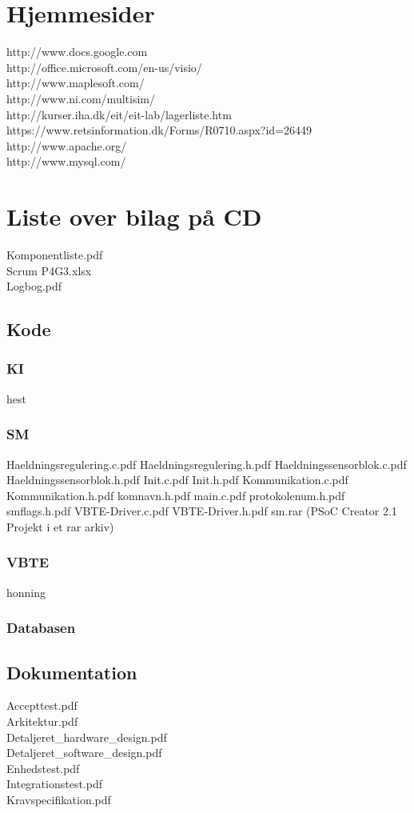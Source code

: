 \section{Hjemmesider}
http://www.docs.google.com\\
http://office.microsoft.com/en-us/visio/\\
http://www.maplesoft.com/\\
http://www.ni.com/multisim/\\
http://kurser.iha.dk/eit/eit-lab/lagerliste.htm\\
https://www.retsinformation.dk/Forms/R0710.aspx?id=26449\\
http://www.apache.org/\\
http://www.mysql.com/\\

\section{Liste over bilag på CD}
Komponentliste.pdf\\
Scrum P4G3.xlsx\\
Logbog.pdf\\
\subsection{Kode}
\subsubsection{KI}
hest
\subsubsection{SM}
Haeldningsregulering.c.pdf
Haeldningsregulering.h.pdf
Haeldningssensorblok.c.pdf
Haeldningssensorblok.h.pdf
Init.c.pdf
Init.h.pdf
Kommunikation.c.pdf
Kommunikation.h.pdf
komnavn.h.pdf
main.c.pdf
protokolenum.h.pdf
smflags.h.pdf
VBTE-Driver.c.pdf
VBTE-Driver.h.pdf
sm.rar (PSoC Creator 2.1 Projekt i et rar arkiv)
\subsubsection{VBTE}
honning
\subsubsection{Databasen}
\subsection{Dokumentation}
Accepttest.pdf\\
Arkitektur.pdf\\
Detaljeret\_hardware\_design.pdf\\
Detaljeret\_software\_design.pdf\\
Enhedstest.pdf\\
Integrationstest.pdf\\
Kravspecifikation.pdf\\

